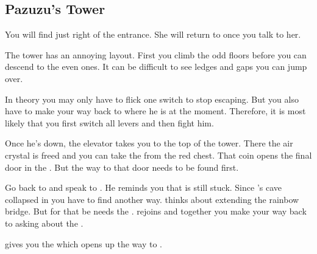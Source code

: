 \subsection{Pazuzu's Tower}
\label{map:pazuzus_tower}

You will find  just right of the entrance. She will return to  once you talk to her.

The tower has an annoying layout. First you climb the odd floors before you can descend to the even ones. It can be difficult to see ledges and gaps you can jump over. 

In theory you may only have to flick one switch to stop  escaping. But you also have to make your way back to where he is at the moment. Therefore, it is most likely that you first switch all levers and then fight him.

Once he's down, the elevator takes you to the top of the tower. There the air crystal is freed and you can take the  from the red chest. That coin opens the final door in the . But the way to that door needs to be found first.

Go back to  and speak to . He reminds you that  is still stuck. Since 's cave collapsed in  you have to find another way.  thinks about extending the rainbow bridge. But for that be needs the .  rejoins and together you make your way back to  asking  about the .

 gives you the  which opens up the way to .



